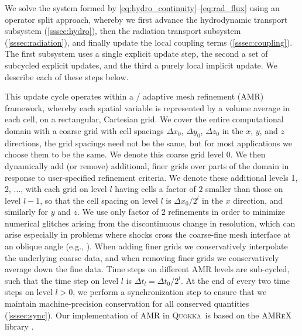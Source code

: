 \documentclass[fleqn,usenatbib]{mnras}
\newcommand{\quokka}{\textsc{Quokka}}
\begin{document}
We solve the system formed by \autoref{eq:hydro_continuity}--\autoref{eq:rad_flux} using an operator split approach, whereby we first advance the hydrodynamic transport subsystem (\autoref{sssec:hydro}), then the radiation transport subsystem (\autoref{sssec:radiation}), and finally update the local coupling terms (\autoref{sssec:coupling}). The first subsystem uses a single explicit update step, the second a set of subcycled explicit updates, and the third a purely local implicit update. We describe each of these steps below.

This update cycle operates within a \citet{Berger:1984} / \citet{Berger:1989} adaptive mesh refinement (AMR) framework, whereby each spatial variable is represented by a volume average in each cell, on a rectangular, Cartesian grid. We cover the entire computational domain with a coarse grid with cell spacings $\Delta x_0$, $\Delta y_0$, $\Delta z_0$ in the $x$, $y$, and $z$ directions, the grid spacings need not be the same, but for most applications we choose them to be the same. We denote this coarse grid level 0. We then dynamically add (or remove) additional, finer grids over parts of the domain in response to user-specified refinement criteria. We denote these additional levels 1, 2, $\ldots$, with each grid on level $l$ having cells a factor of $2$ smaller than those on level $l-1$, so that the cell spacing on level $l$ is $\Delta x_0/2^l$ in the $x$ direction, and similarly for $y$ and $z$. We use only factor of 2 refinements in order to minimize numerical glitches arising from the discontinuous change in resolution, which can arise especially in problems where shocks cross the coarse-fine mesh interface at an oblique angle (e.g., \citealt{Fryxell_2000}). When adding finer grids we conservatively interpolate the underlying coarse data, and when removing finer grids we conservatively average down the fine data. Time steps on different AMR levels are sub-cycled, such that the time step on level $l$ is $\Delta t_l = \Delta t_0/2^l$. At the end of every two time steps on level $l > 0$, we perform a synchronization step to ensure that we maintain machine-precision conservation for all conserved quantities (\autoref{sssec:sync}). Our implementation of AMR in \quokka~is based on the \textsc{AMReX} library \citep{AMReX_JOSS, the_amrex_development_team_2021_5363443}.
\end{document}
